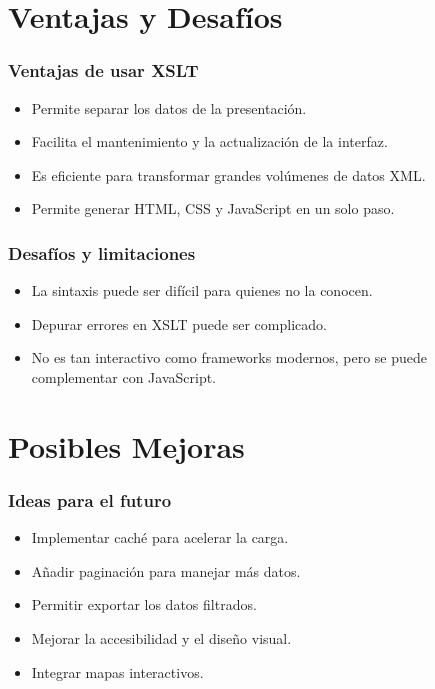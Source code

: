 \documentclass{beamer}
\begin{document}
\section{Ventajas y Desafíos}


\begin{frame}
\frametitle{Ventajas de usar XSLT}
\begin{itemize}
    \item Permite separar los datos de la presentación.
    \item Facilita el mantenimiento y la actualización de la interfaz.
    \item Es eficiente para transformar grandes volúmenes de datos XML.
    \item Permite generar HTML, CSS y JavaScript en un solo paso.
\end{itemize}
\end{frame}

\begin{frame}
\frametitle{Desafíos y limitaciones}
\begin{itemize}
    \item La sintaxis puede ser difícil para quienes no la conocen.
    \item Depurar errores en XSLT puede ser complicado.
    \item No es tan interactivo como frameworks modernos, pero se puede complementar con JavaScript.
\end{itemize}
\end{frame}

\section{Posibles Mejoras}


\begin{frame}
\frametitle{Ideas para el futuro}
\begin{itemize}
    \item Implementar caché para acelerar la carga.
    \item Añadir paginación para manejar más datos.
    \item Permitir exportar los datos filtrados.
    \item Mejorar la accesibilidad y el diseño visual.
    \item Integrar mapas interactivos.
\end{itemize}
\end{frame}
\end{document}
